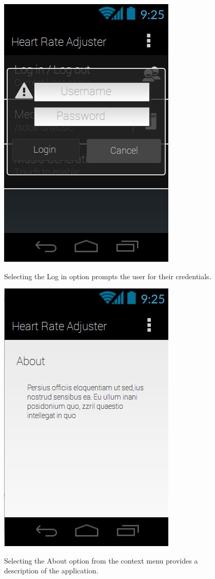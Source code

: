 \documentclass[letterpaper,english]{scrreprt}
\begin{document}
\begin{figure}[H]
	\centering
	\includegraphics{mobile_ui/4.png}\\
	\caption{Selecting the Log in option prompts the user for their credentials.}
\end{figure}

\begin{figure}[H]
	\centering
	\includegraphics{mobile_ui/5.png}\\
	\caption{Selecting the About option from the context menu provides a description of the application.}
\end{figure}
\end{document}
